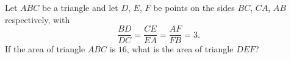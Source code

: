 Let $ABC$ be a triangle and let $D$, $E$, $F$ be points on the sides $BC$, $CA$, $AB$ respectively, with
\[\dfrac{BD}{DC}=\dfrac{CE}{EA}=\dfrac{AF}{FB}=3.\]
If the area of triangle $ABC$ is $16$, what is the area of triangle $DEF$?
